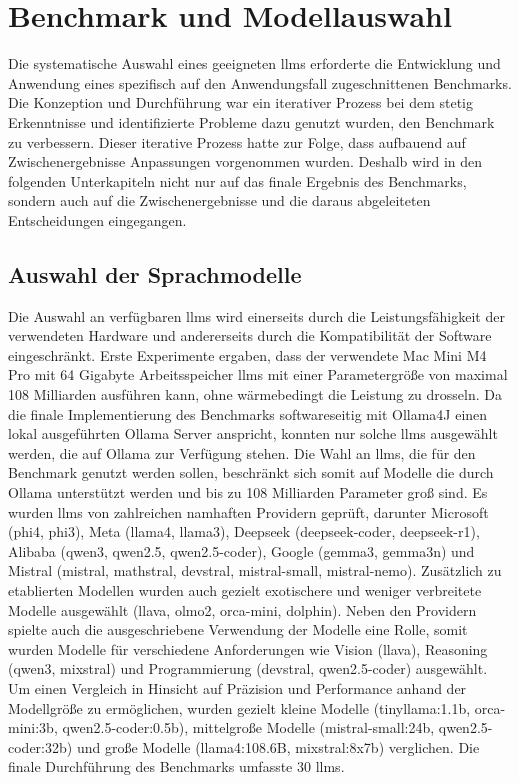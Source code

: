 \chapter{Benchmark und Modellauswahl}\label{ch:benchmark}

Die systematische Auswahl eines geeigneten \glspl{llm} erforderte die Entwicklung und Anwendung eines spezifisch auf den Anwendungsfall zugeschnittenen Benchmarks.
Die Konzeption und Durchführung war ein iterativer Prozess bei dem stetig Erkenntnisse und identifizierte Probleme dazu genutzt wurden, den Benchmark zu verbessern.
Dieser iterative Prozess hatte zur Folge, dass aufbauend auf Zwischenergebnisse Anpassungen vorgenommen wurden.
Deshalb wird in den folgenden Unterkapiteln nicht nur auf das finale Ergebnis des Benchmarks, sondern auch auf die Zwischenergebnisse und die daraus abgeleiteten Entscheidungen eingegangen.

\section{Auswahl der Sprachmodelle}\label{sec:modelle-benchmark}

Die Auswahl an verfügbaren \glspl{llm} wird einerseits durch die Leistungsfähigkeit der verwendeten Hardware und andererseits durch die Kompatibilität der Software eingeschränkt.
Erste Experimente ergaben, dass der verwendete Mac Mini M4 Pro mit 64 Gigabyte Arbeitsspeicher \glspl{llm} mit einer Parametergröße von maximal 108 Milliarden ausführen kann, ohne wärmebedingt die Leistung zu drosseln.
Da die finale Implementierung des Benchmarks softwareseitig mit Ollama4J einen lokal ausgeführten Ollama Server anspricht, konnten nur solche \glspl{llm} ausgewählt werden, die auf Ollama zur Verfügung stehen.
Die Wahl an \glspl{llm}, die für den Benchmark genutzt werden sollen, beschränkt sich somit auf Modelle die durch Ollama unterstützt werden und bis zu 108 Milliarden Parameter groß sind.
Es wurden \glspl{llm} von zahlreichen namhaften Providern geprüft, darunter Microsoft (phi4, phi3), Meta (llama4, llama3), Deepseek (deepseek-coder, deepseek-r1), Alibaba (qwen3, qwen2.5, qwen2.5-coder), Google (gemma3, gemma3n) und Mistral (mistral, mathstral, devstral, mistral-small, mistral-nemo).
Zusätzlich zu etablierten Modellen wurden auch gezielt exotischere und weniger verbreitete Modelle ausgewählt (llava, olmo2, orca-mini, dolphin).
Neben den Providern spielte auch die ausgeschriebene Verwendung der Modelle eine Rolle, somit wurden Modelle für verschiedene Anforderungen wie Vision (llava), Reasoning (qwen3, mixstral) und Programmierung (devstral, qwen2.5-coder) ausgewählt.
Um einen Vergleich in Hinsicht auf Präzision und Performance anhand der Modellgröße zu ermöglichen, wurden gezielt kleine Modelle (tinyllama:1.1b, orca-mini:3b, qwen2.5-coder:0.5b), mittelgroße Modelle (mistral-small:24b, qwen2.5-coder:32b) und große Modelle (llama4:108.6B, mixstral:8x7b) verglichen.
Die finale Durchführung des Benchmarks umfasste 30 \glspl{llm}.

